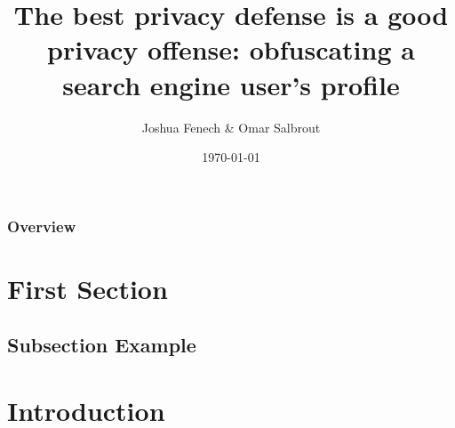 \documentclass{beamer}
\title[The best privacy defense is a good privacy offense]{The best privacy defense is a good privacy offense: obfuscating a search engine user’s profile} %
\author{Joshua Fenech \& Omar Salbrout} %
\institute[MLDM] %
{University of Jean Monnet \\ %
\medskip
\textit{jfenech22@hotmail.com} %
}
\date{\today} %
\begin{document}
\begin{frame}
\titlepage %
\end{frame}

\begin{frame}
\frametitle{Overview} %
\tableofcontents %
\end{frame}


\section{First Section} %

\subsection{Subsection Example} %


\section{Introduction}
\end{document}
